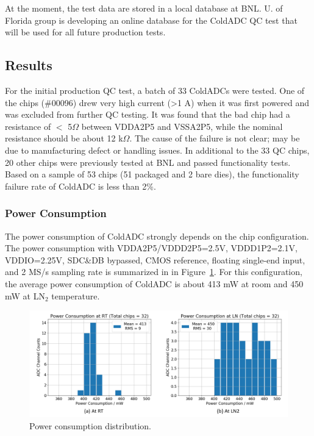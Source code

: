 At the moment, the test data are stored in a local database at BNL. U. of Florida group is developing an online database for the ColdADC QC test that will be used for all future production tests.

\subsection{Results}
\label{sec:6.2}
For the initial production QC test, a batch of 33 ColdADCs were tested. One of the chips (\#00096)  drew very high current (>1 A) when it 
was first powered and was excluded from further QC testing. It was found that the bad chip had a resistance of $<$ 5$\Omega$ between 
VDDA2P5 and VSSA2P5, while the nominal resistance should be about 12 k$\Omega$. The cause of the failure is not clear; may be due to 
manufacturing defect or handling issues. In additional to the 33 QC chips, 20 other chips were previously tested at BNL and passed 
functionality tests. Based on a sample of 53 chips (51 packaged and 2 bare dies), the functionality failure rate of ColdADC is less than 2\%.

\subsubsection{Power Consumption}
The power consumption of ColdADC strongly depends on the chip configuration. The power consumption with VDDA2P5/VDDD2P5=2.5V, 
VDDD1P2=2.1V, VDDIO=2.25V, SDC\&DB bypassed, CMOS reference, floating single-end input, and 2 MS/s sampling rate is summarized in in 
Figure~\ref{fig:qc_power}. For this configuration, the average power consumption of ColdADC is about 413 mW at room and 450 mW at LN$_2$ temperature.
\begin{figure}[h!]
\centering
  \includegraphics[width=0.85\linewidth]{figures/qc_power.png}
  \caption{Power consumption distribution.}
  \label{fig:qc_power}
\end{figure}

